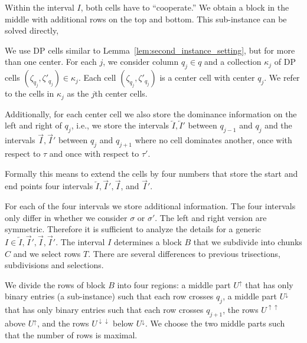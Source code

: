 Within the interval $I$, both cells have to ``cooperate.''
We obtain a \BMEC block in the middle with additional rows on the top and bottom. 
This sub-instance can be solved directly,

We use DP cells similar to Lemma~\ref{lem:second_instance_setting}, but for more than one center.
For each $j$, we consider column $q_j\in q$ and a collection $\kappa_j$ of DP cells $(\zeta_{q_j},\zeta'_{q_j}) \in \kappa_j$.
Each cell $(\zeta_{q_j},\zeta'_{q_j})$ is a center cell with center $q_j$.
We refer to the cells in $\kappa_j$ as the $j$th center cells.

Additionally, for each center cell we also store the dominance information on the left and right of $q_j$, 
i.e., we store the intervals $\overleftarrow{I}, \overleftarrow{I}'$ between $q_{j-1}$ and $q_j$ and the intervals $\overrightarrow{I},\overrightarrow{I}'$ between $q_j$ and $q_{j+1}$ where no cell dominates another, once with respect to $\tau$ and  once with respect to $\tau'$.

Formally this means to extend the cells by four numbers that store the start and end points four intervals $\overleftarrow{I},\overrightarrow{I}',\overrightarrow{I}$, and $\overrightarrow{I}'$.

For each of the four intervals we store additional information.
The four intervals only differ in whether we consider $\sigma$ or $\sigma'$. The left and right version are symmetric.
Therefore it is sufficient to analyze the details for a generic $I \in \overleftarrow{I},\overrightarrow{I}',\overrightarrow{I},\overrightarrow{I}'$.
The interval ${I}$ determines a block ${B}$ that we subdivide into chunks ${C}$ and we select rows ${T}$.
There are several differences to previous trisections, subdivisions and selections.

We divide the rows of block ${B}$ into four regions: 
a middle part ${U^\uparrow}$ that has only binary entries (a \BMEC sub-instance) such that each row crosses $q_j$,
a middle part ${U^\downarrow}$ that has only binary entries such that each row crosses $q_{j+1}$,
the rows ${U}^{\uparrow\uparrow}$ above ${U}^\uparrow$, and the rows ${U}^{\downarrow\downarrow}$ below ${U}^\downarrow$.
We choose the two middle parts such that the number of rows is maximal.

